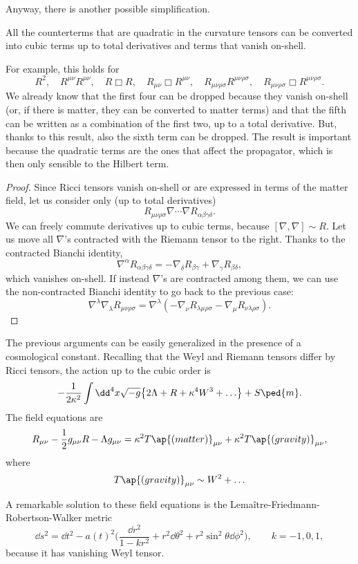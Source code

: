 \documentclass[a4paper,12pt]{book}
\begin{document}
Anyway, there is another possible simplification.
\begin{theorem}
All the counterterms that are quadratic in the curvature tensors can be converted into cubic terms up to total derivatives and terms that vanish on-shell.
\end{theorem}
For example, this holds for
\[R^2,\quad R^{\mu\nu}R^{\mu\nu},\quad R\Box R,\quad R_{\mu\nu}\Box R^{\mu\nu},\quad R_{\mu\nu\rho\sigma}R^{\mu\nu\rho\sigma},\quad R_{\mu\nu\rho\sigma}\Box R^{\mu\nu\rho\sigma}.\]
We already know that the first four can be dropped because they vanish on-shell (or, if there is matter, they can be converted to matter terms) and that the fifth can be written as a combination of the first two, up to a total derivative. But, thanks to this result, also the sixth term can be dropped. The result is important because the quadratic terms are the ones that affect the propagator, which is then only sensible to the Hilbert term.
\begin{proof}
Since Ricci tensors vanish on-shell or are expressed in terms of the matter field, let us consider only (up to total derivatives)
\[R_{\mu\nu\rho\sigma}\nabla\cdots\nabla R_{\alpha\beta\gamma\delta}.\]
We can freely commute derivatives up to cubic terms, because $[\nabla,\nabla]\sim R$. Let us move all $\nabla$'s contracted with the Riemann tensor to the right. Thanks to the contracted Bianchi identity,
\[\nabla^\alpha R_{\alpha\beta\gamma\delta}=-\nabla_\delta R_{\beta\gamma}+\nabla_\gamma R_{\beta\delta},\]
which vanishes on-shell. If instead $\nabla$'s are contracted among them, we can use the non-contracted Bianchi identity to go back to the previous case:
\[\nabla^\lambda\nabla_\lambda R_{\mu\nu\rho\sigma}=\nabla^\lambda(-\nabla_\nu R_{\lambda\mu\rho\sigma}-\nabla_\mu R_{\nu\lambda\rho\sigma}).\]
\end{proof}

The previous arguments can be easily generalized in the presence of a cosmological constant. Recalling that the Weyl and Riemann tensors differ by Ricci tensors, the action up to the cubic order is
\[-\frac1{2\kappa^2}\int\dd^4x\sqrt{-g}\bigl\{2\Lambda+R+\kappa^4W^3+\ldots\bigr\}+S\ped{m}.\]
The field equations are
\[R_{\mu\nu}-\frac12g_{\mu\nu}R-\Lambda g_{\mu\nu}=\kappa^2T\ap{(matter)}_{\mu\nu}+\kappa^2T\ap{(gravity)}_{\mu\nu},\]
where
\[T\ap{(gravity)}_{\mu\nu}\sim W^2+\ldots\]

A remarkable solution to these field equations is the Lemaître-Friedmann-Robertson-Walker metric
\[\dd s^2=\dd t^2-a(t)^2\biggl(\frac{\dd r^2}{1-kr^2}+r^2\dd\theta^2+r^2\sin^2\theta\dd\phi^2\biggr),\qquad k=-1,0,1,\]
because it has vanishing Weyl tensor.
\end{document}
